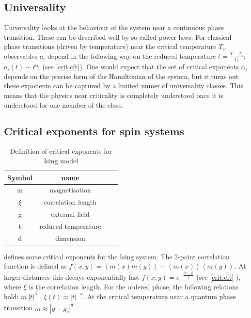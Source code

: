 \subsection{Universality}

Universality looks at the behaviour of the system near a continuous phase transition. These can be described well by so-called power laws. For classical phase transitions (driven by temperature) near the critical temperature $T_c$, observables $a_i$ depend in the following way on the reduced temperature $t=\frac{T-T_c}{T_c}$: $ a_i(t) \sim t^{\alpha_i}$ (see \cref{crit:cft}). One would expect that the set of critical exponents ${\alpha_i}$ depends on the precise form of the Hamiltonian of the system, but it turns out these exponents can be captured by a limited numer of universality classes. This means that the physics near criticality is completely understood once it is understood for one member of the class.

\subsection{Critical exponents for spin systems}
\begin{table}[h!]
    \centering
    \caption{Definition of critical exponents for Ising model}
    \begin{tabular}{c c c c}
        Symbol & name                \\
        \hline
        m      & magnetisation       \\
        $\xi$  & correlation length  \\
        g      & external field      \\
        t      & reduced temperature \\
        d      & dimension           \\
    \end{tabular}
    \label{isingtable}
\end{table}

 defines some critical exponents for the Ising system. The 2-point correlation function is defined as $ f( x,y) =  \left < m(x) m(y) \right > -  \left<m(x) \right> \left<m(y) \right> $. At larger distances this decays exponentially fast $ f(  x,y ) = e^{ -\frac{ |x-y|}{ \xi} } $ (see \cref{crit:cft} ), where $\xi$ is the correlation length. For the ordered phase, the following relations hold: $m ~ |t|^{\beta} $ , $\xi(t) \approx |t|^{-\nu} $. At the critical temperature near a quantum phase transition  $ m \approx |g-g_c|^{\frac{1}{\delta}} $. 

